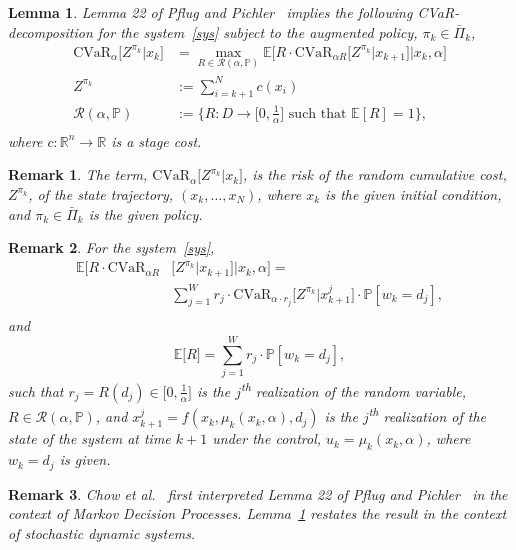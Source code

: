 \documentclass[letterpaper, 10 pt, conference]{ieeeconf}  %
\newtheorem{lemma}{Lemma}
\newtheorem{remark}{Remark}
\begin{document}
\begin{lemma}\label{decomlemma}
Lemma 22 of Pflug and Pichler~\cite{pflug2016time} implies the following CVaR-decomposition for the system~\eqref{sys}
subject to the augmented policy, $\pi_k \in \bar{\Pi}_k$, 
\begin{equation}\label{decomp}\begin{aligned}
\text{CVaR}_\alpha \Big[ Z^{\pi_k} \Big| x_k \Big] & = {\underset{R \in \mathcal{R}(\alpha, \mathbb{P})}\max} \mathbb{E}\Big[ R\cdot \text{CVaR}_{\alpha R}\big[ Z^{\pi_k} \big| x_{k+1}\big] \Big| x_k, \alpha \Big] \\
Z^{\pi_k} & := \sum_{i=k+1}^N c(x_i) \\
\mathcal{R}(\alpha, \mathbb{P}) & := \Big\{ R : D \rightarrow \Big[0, \frac{1}{\alpha}\Big] \text{ such that } \mathbb{E}[R] = 1 \Big\}, \\
\end{aligned}\end{equation}
where $c : \mathbb{R}^n \rightarrow \mathbb{R}$ is a stage cost.
\end{lemma}
\begin{remark}
The term, $\text{CVaR}_\alpha \big[ Z^{\pi_k} \big| x_k \big]$, is the risk of 
the random cumulative cost, $Z^{\pi_k}$, of the state trajectory, $(x_k, \dots, x_{N})$, where $x_k$ is the given initial condition, 
and $\pi_k \in \bar{\Pi}_k$ is the given policy.
\end{remark}
\begin{remark}
For the system~\eqref{sys},
\begin{equation*}\begin{aligned}
\mathbb{E}\Big[ R\cdot \text{CVaR}_{\alpha R} & \big[ Z^{\pi_k} \big| x_{k+1}\big] \Big| x_k, \alpha \Big] = \\
& \textstyle\sum_{j=1}^W r_j \cdot \text{CVaR}_{\alpha \cdot r_j}\big[ Z^{\pi_k} \big| x_{k+1}^j \big] \cdot \mathbb{P}[w_k = d_j],\\
\end{aligned}\end{equation*}
and 
$$\mathbb{E}\big[ R ] = \textstyle \sum_{j=1}^W r_j \cdot \mathbb{P}[w_k = d_j],$$
such that $r_j = R(d_j) \in \big[0, \frac{1}{\alpha}\big]$ is the $j$\textsuperscript{th} realization of the random variable, $R \in \mathcal{R}(\alpha, \mathbb{P})$, and 
$x_{k+1}^j = f(x_k, \mu_k(x_k, \alpha), d_j)$ is the $j$\textsuperscript{th} realization of the state
of the system at time $k+1$ under the control, $u_k = \mu_k(x_k, \alpha)$, where $w_k = d_j$ is given.
\end{remark}
\begin{remark}
Chow et al.~\cite{chow2015risk} first interpreted Lemma 22 of Pflug and Pichler~\cite{pflug2016time} 
in the context of Markov Decision Processes.
Lemma~\ref{decomlemma} restates the result in the context of stochastic dynamic systems.
\end{remark}
\end{document}
